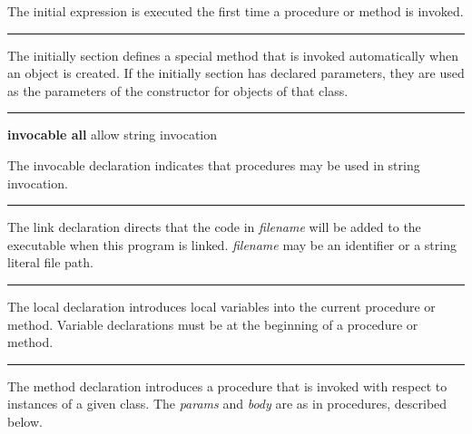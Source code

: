 \noindent
{}The \textsf{initial} expression is executed the first
time a procedure or method is invoked.

\bigskip\hrule\vspace{0.1cm}

\noindent
{}The \textsf{initially} section defines a special method
that is invoked automatically when an object is created. If the
\textsf{initially} section has declared parameters, they are used as
the parameters of the constructor for objects
of that class.

\bigskip\hrule\vspace{0.1cm}

\noindent
{}
{\textbf{invocable all} \hfill allow string invocation}

\noindent
The \textsf{invocable} declaration indicates that procedures may be used
in string invocation.

\bigskip\hrule\vspace{0.1cm}

\noindent
The \textsf{link} declaration directs that the code in
\textit{filename} will be added to the executable when this program is
linked. \textit{filename} may be an identifier or a string literal file
path.

\bigskip\hrule\vspace{0.1cm}

\noindent
{}The \textsf{local} declaration introduces local
variables into the current procedure or method.
Variable declarations must be at the beginning of a
procedure or method.

\bigskip\hrule\vspace{0.1cm}

\noindent
{}The \textsf{method} declaration introduces a procedure
that is invoked with respect to instances of
a given class. The \textit{params} and \textit{body}
are as in procedures, described below.

